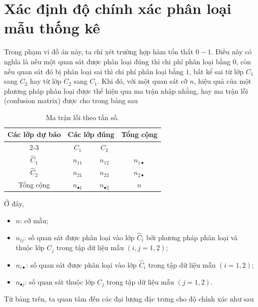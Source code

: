 \section{Xác định độ chính xác phân loại mẫu thống kê}

Trong phạm vi đồ án này, ta chỉ xét trường hợp hàm tổn thất $0-1$. 
Điều này có nghĩa là nếu một quan sát được phân loại đúng thì chi phí phân loại bằng $0$, 
còn nếu quan sát đó bị phân loại sai thì chi phí phân loại bằng $1$, bất kể sai từ lớp $C_1$ sang $C_2$ hay từ lớp $C_2$ sang $C_1$. Khi đó, với một quan sát cỡ $n$, hiệu quả của một phương pháp phân loại được thể hiện qua ma trận nhập nhằng, hay ma trận lỗi (confusion matrix) được cho trong bảng sau 



\begin{table}[H]
	\centering
	\begin{tabular}{|c|cc|c|}
		\hline
		\multirow{2}{*}{Các lớp dự báo} & \multicolumn{2}{c|}{Các lớp đúng} & \multirow{2}{*}{Tổng cộng} \\ \cline{2-3}
		& $C_1$ & $C_2$ & \\ \hline
		$\hat{C}_1$ & $n_{11}$ & $n_{12}$ & $n_{1\bullet}$ \\
		$\hat{C}_2$ & $n_{21}$ & $n_{22}$ & $n_{2\bullet}$ \\ \hline
		Tổng cộng & $n_{\bullet 1}$ & $n_{\bullet 2}$  & $n$ \\ \hline
	\end{tabular}
	\caption{Ma trận lỗi theo tần số.}
	\label{tab:MaTranLoiTanSo}
\end{table}
Ở đây,
\begin{itemize}
	\item $n$: cỡ mẫu;
	\item $n_{ij}$: số quan sát được phân loại vào lớp $\hat{C}_i$ bởi phương pháp phân loại và thuộc lớp $C_j$ trong tập dữ liệu mẫu $(i,j=1,2)$;
	\item $n_{i\bullet}$: số quan sát được phân loại vào lớp $\hat{C}_i$ trong tập dữ liệu mẫu $(i=1,2)$;
	\item $n_{\bullet j}$: số quan sát thuộc lớp $C_j$ trong tập dữ liệu mẫu $(j=1,2)$.
\end{itemize}
Từ bảng trên, ta quan tâm đến các đại lượng đặc trưng cho độ chính xác như sau
